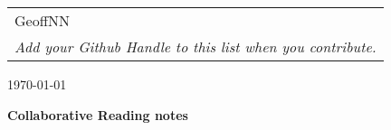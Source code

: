 \documentclass[12pt]{article}
\begin{document}
{\parindent 0pt
\begin{tabular}[t]{l}
GeoffNN
\\ \textit{Add your Github Handle to this list when you contribute.}
\end{tabular}  \hfill \today \vskip 0.2in }

\parindent 0pt
\parskip 8pt

\begin{center}
\large\bf Collaborative Reading notes
\end{center}

\bigskip




\end{document}
